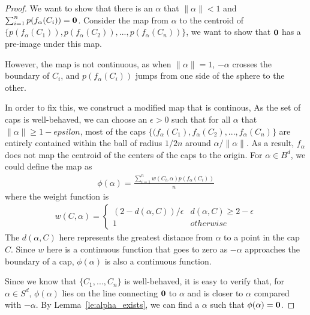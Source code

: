 \begin{proof}
We want to show that there is an $\alpha$ that $\|\alpha\| < 1$ and $\sum_{i=1}^{n}p(f_\alpha(C_i))=\boldsymbol{\mathbf{0}}$.
Consider the map from $\alpha$ to the centroid of $\{p(f_\alpha(C_1)), p(f_\alpha(C_2)), ..., p(f_\alpha(C_n))\}$, we want to show that $\boldsymbol{\mathbf{0}}$ has a pre-image under this map.

However, the map is not continuous, as when $\|\alpha\| =1$, $-\alpha$ crosses the boundary of $C_i$, and $p(f_\alpha(C_i))$ jumps from one side of the sphere to the other. 

In order to fix this, we construct a modified map that is continous, As the set of caps is well-behaved, we can choose an $\epsilon > 0$ such that for all $\alpha$ that $\|\alpha\| \geq 1-epsilon$, most of the caps $\{(f_\alpha(C_1), f_\alpha(C_2), ..., f_\alpha(C_n)\}$ are entirely contained within the ball of radius $1/2n$ around $\alpha /\|\alpha\|$. As a result, $f_\alpha$ does not map the centroid of the centers of the caps to the origin. For $\alpha \in B^d$, we could define the map as 
\begin{align*}
    \phi(\alpha) = \frac{\sum_{i=1}^{n}w(C_i,\alpha)p(f_\alpha(C_i))}{n}
\end{align*}
where the weight function is 
\begin{align*}
    w(C, \alpha) =  \begin{cases} 
      (2-d(\alpha,C))/\epsilon & d(\alpha,C)\geq 2-\epsilon \\
       1 & otherwise 
   \end{cases}
\end{align*}
The $d(\alpha,C)$ here represents the greatest distance from $\alpha$ to a point in the cap $C$. Since $w$ here is a continuous function that goes to zero as $-\alpha$ approaches the boundary of a cap, $\phi(\alpha)$ is also a continuous function.  

Since we know that $\{C_1, ..., C_n\}$ is well-behaved, it is easy to verify that, for $\alpha \in S^d$, $\phi(\alpha)$ lies on the line connecting $\boldsymbol{\mathbf{0}}$ to $\alpha$ and is closer to $\alpha$ compared with $-\alpha$. By Lemma~\ref{le:alpha_exists}, we can find a $\alpha$ such that $\phi(\alpha)=\boldsymbol{\mathbf{0}}$.
\end{proof}